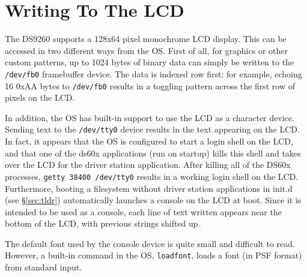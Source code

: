 \documentclass[]{article}
\begin{document}
\section{Writing To The LCD}
\par The DS9260 supports a 128x64 pixel monochrome LCD display. This can be accessed in two different ways from the OS. First of all, for graphics or other custom patterns, up to 1024 bytes of binary data can simply be written to the \texttt{/dev/fb0} framebuffer device. The data is indexed row first: for example, echoing 16 0xAA bytes to \texttt{/dev/fb0} results in a toggling pattern across the first row of pixels on the LCD.
\par In addition, the OS has built-in support to use the LCD as a character device. Sending text to the \texttt{/dev/tty0} device results in the text appearing on the LCD. In fact, it appears that the OS is configured to start a login shell on the LCD, and that one of the ds60x applications (run on startup) kills this shell and takes over the LCD for the driver station application. After killing all of the DS60x processes, \texttt{getty 38400 /dev/tty0} results in a working login shell on the LCD. Furthermore, booting a filesystem without driver station applications in init.d (see \S\ref{sec:tldr}) automatically launches a console on the LCD at boot. Since it is intended to be used as a console, each line of text written appears near the bottom of the LCD, with previous strings shifted up. 
\par The default font used by the console device is quite small and difficult to read. However, a built-in command in the OS, \texttt{loadfont}, loads a font (in PSF format) from standard input. 
\end{document}
